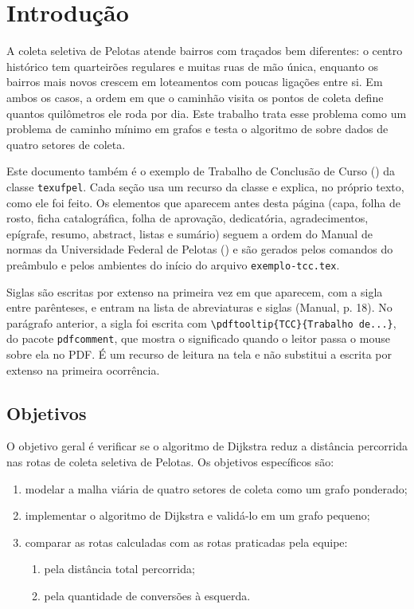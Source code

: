 \documentclass[tcc,capa]{texufpel}
\begin{document}
\chapter{Introdução}
\label{cap:introducao}

A coleta seletiva de Pelotas atende bairros com traçados bem diferentes: o
centro histórico tem quarteirões regulares e muitas ruas de mão única, enquanto
os bairros mais novos crescem em loteamentos com poucas ligações entre si.
Em ambos os casos, a ordem em que o caminhão visita os pontos de coleta define
quantos quilômetros ele roda por dia. Este trabalho trata esse problema como
um problema de caminho mínimo em grafos e testa o algoritmo de
\citet{Dijkstra:1959:NTP} sobre dados de quatro setores de coleta.

Este documento também é o exemplo de Trabalho de Conclusão de Curso
() da classe
\texttt{texufpel}. Cada seção usa um recurso da classe e
explica, no próprio texto, como ele foi feito. Os elementos que aparecem antes
desta página (capa, folha de rosto, ficha catalográfica, folha de aprovação,
dedicatória, agradecimentos, epígrafe, resumo, abstract, listas e sumário)
seguem a ordem do Manual de normas da Universidade Federal de Pelotas
() e são gerados pelos comandos do
preâmbulo e pelos ambientes do início do arquivo \texttt{exemplo-tcc.tex}.

Siglas são escritas por extenso na primeira vez em que aparecem, com a sigla
entre parênteses, e entram na lista de abreviaturas e siglas (Manual, p. 18).
No parágrafo anterior, a sigla foi escrita com
\verb|\pdftooltip{TCC}{Trabalho de...}|, do pacote \texttt{pdfcomment}, que
mostra o significado quando o leitor passa o mouse sobre ela no PDF. É um recurso de leitura na tela e não substitui a escrita por extenso
na primeira ocorrência.

\section{Objetivos}
\label{sec:objetivos}

O objetivo geral é verificar se o algoritmo de Dijkstra reduz a distância
percorrida nas rotas de coleta seletiva de Pelotas. Os objetivos específicos
são:

\begin{enumerate}
  \item modelar a malha viária de quatro setores de coleta como um grafo
        ponderado;
  \item implementar o algoritmo de Dijkstra e validá-lo em um grafo pequeno;
  \item comparar as rotas calculadas com as rotas praticadas pela equipe:
  \begin{enumerate}
    \item pela distância total percorrida;
    \item pela quantidade de conversões à esquerda.
  \end{enumerate}
\end{enumerate}
\end{document}
